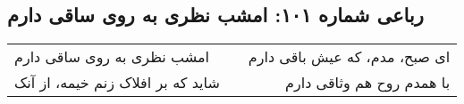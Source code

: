 \begin{center}
\section*{رباعی شماره ۱۰۱: امشب نظری به روی ساقی دارم}
\label{sec:101}
\begin{longtable}{l p{0.5cm} r}
امشب نظری به روی ساقی دارم
&&
ای صبح، مدم، که عیش باقی دارم
\\
شاید که بر افلاک زنم خیمه، از آنک
&&
با همدم روح هم وثاقی دارم
\\
\end{longtable}
\end{center}
